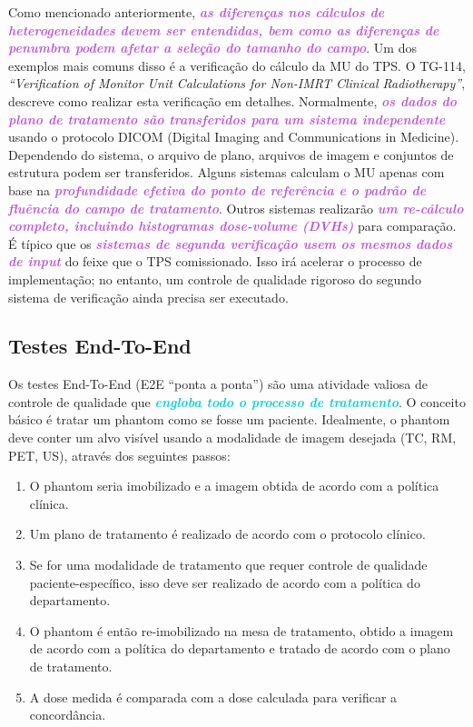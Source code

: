 \documentclass[11pt,a4paper]{article}
\newcounter{exemplo}
\begin{document}
	Como mencionado anteriormente, \textcolor{MediumOrchid}{\textbf{\textit{as diferenças nos cálculos de heterogeneidades devem ser entendidas, bem como as diferenças de penumbra podem afetar a seleção do tamanho do campo}}}. Um dos exemplos mais comuns disso é a verificação do cálculo da MU do TPS.  O TG-114, \textit{``Verification of Monitor Unit Calculations for Non-IMRT Clinical Radiotherapy''}, descreve como realizar esta verificação em detalhes. Normalmente, \textcolor{MediumOrchid}{\textbf{\textit{os dados do plano de tratamento são transferidos para um sistema independente}}} usando o protocolo DICOM (Digital Imaging and Communications in Medicine). Dependendo do sistema, o arquivo de plano, arquivos de imagem e conjuntos de estrutura podem ser transferidos. Alguns sistemas calculam o MU apenas com base na \textcolor{MediumOrchid}{\textbf{\textit{profundidade efetiva do ponto de referência e o padrão de fluência do campo de tratamento}}}. Outros sistemas realizarão \textcolor{MediumOrchid}{\textbf{\textit{um re-cálculo completo, incluindo histogramas dose-volume (DVHs)}}} para comparação. É típico que os \textcolor{MediumOrchid}{\textbf{\textit{sistemas de segunda verificação usem os mesmos dados de input}}} do feixe que o TPS comissionado. Isso irá acelerar o processo de implementação; no entanto, um controle de qualidade rigoroso do segundo sistema de verificação ainda precisa ser executado.

\subsection*{Testes End-To-End}

	Os testes End-To-End (E2E ``ponta a ponta'')  são uma atividade valiosa de controle de qualidade que \textcolor{DarkTurquoise}{\textbf{\textit{engloba todo o processo de tratamento}}}. O conceito básico é tratar um phantom como se fosse um paciente. Idealmente, o phantom deve conter um alvo visível usando a modalidade de imagem desejada (TC, RM, PET, US), através dos seguintes passos:
	
	\begin{enumerate}[label=\textcolor{CarnationPink}{\arabic*${}^\circ $}]
		\item O phantom seria imobilizado e a imagem obtida de acordo com a política clínica.
		\item Um plano de tratamento é realizado de acordo com o protocolo clínico.
		\item Se for uma modalidade de tratamento que requer controle de qualidade paciente-específico, isso deve ser realizado de acordo com a política do departamento.
		\item O phantom é então re-imobilizado na mesa de tratamento, obtido a imagem de acordo com a política do departamento e tratado de acordo com o plano de tratamento.
		\item A dose medida é comparada com a dose calculada para verificar a concordância.
	\end{enumerate}
\end{document}
